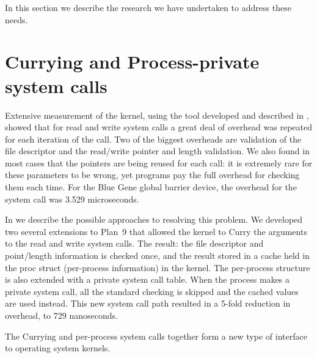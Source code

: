 In this section we describe the research we have undertaken to address these needs. 

\section{Currying and Process-private system calls}
Extensive measurement of the kernel, using the tool developed and described in \cite{plan9trace}, showed
that for read and write system calls a great deal of overhead was repeated for each iteration of the 
call. Two of the biggest overheads are validation of the file descriptor and the read/write pointer and 
length validation. We also found in most cases that the pointers are being reused for each call: it is extremely rare for these parameters to be wrong, yet programs pay the full overhead for checking them 
each time. For the Blue Gene global barrier device, the overhead for the system call was 3.529 microseconds. 

In \cite{currying} we describe the possible approaches to resolving this problem. We developed two 
several extensions to Plan~9 that allowed the kernel to Curry the arguments to the read and write
system calls. The result: the file descriptor and point/length information is checked once, and the
result stored in a cache held in the proc struct (per-process information) in the kernel. The per-process structure is 
also extended with a private system call table. When the process makes a private system
call, all the standard checking is skipped and the cached values are used instead. This 
new system call path resulted in a 5-fold reduction in overhead, to 729 nanoseconds. 

The Currying and per-process system calls together form a new type of interface to operating system
kernels. 


